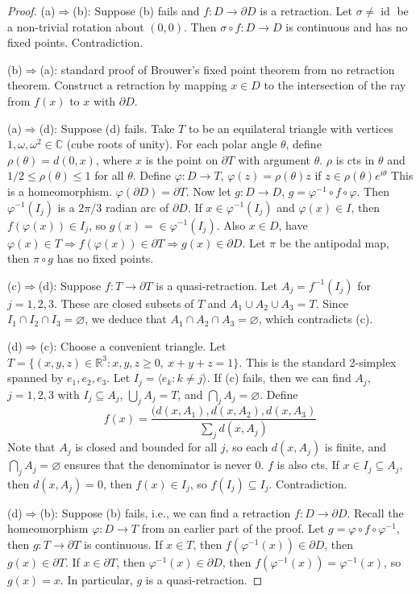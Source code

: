\documentclass{article}
\theoremstyle{definition}
\theoremstyle{remark}
\theoremstyle{plain}
\newcommand{\RR}{\mathbb{R}}
\newcommand{\CC}{\mathbb{C}}
\newcommand{\id}{\operatorname{id}}
\begin{document}
\begin{proof}
    (a)$\Rightarrow$(b): Suppose (b) fails and $f:D\to\partial D$ is a retraction. Let $\sigma\neq\id$ be a non-trivial rotation about $(0,0)$. Then $\sigma\circ f:D\to D$ is continuous and has no fixed points. Contradiction.

    (b)$\Rightarrow$(a): standard proof of Brouwer's fixed point theorem from no retraction theorem. Construct a retraction by mapping $x\in D$ to the intersection of the ray from $f(x)$ to $x$ with $\partial D$. 

    (a)$\Rightarrow$(d): Suppose (d) fails. Take $T$ to be an equilateral triangle with vertices $1,\omega,\omega^2\in\CC$ (cube roots of unity). For each polar angle $\theta$, define $\rho(\theta)=d(0,x)$, where $x$ is the point on $\partial T$ with argument $\theta$. $\rho$ is cts in $\theta$ and $1/2\le\rho(\theta)\le 1$ for all $\theta$. Define $\varphi:D\to T$, $\varphi(z)=\rho(\theta)z$ if $z\in\rho(\theta) e^{i\theta}$ This is a homeomorphism. $\varphi(\partial D)=\partial T$. Now let $g:D\to D$, $g=\varphi^{-1}\circ f\circ\varphi$. Then $\varphi^{-1}(I_j)$ is a $2\pi/3$ radian arc of $\partial D$. If $x\in\varphi^{-1}(I_j)$ and $\varphi(x)\in I$, then $f(\varphi(x))\in I_j$, so $g(x)=\in\varphi^{-1}(I_j)$. Also $x\in D$, have $\varphi(x)\in T\Rightarrow f(\varphi(x))\in\partial T\Rightarrow g(x)\in\partial D$. Let $\pi$ be the antipodal map, then $\pi\circ g$ has no fixed points.

    (c)$\Rightarrow$(d): Suppose $f:T\to\partial T$ is a quasi-retraction. Let $A_j=f^{-1}(I_j)$ for $j=1,2,3$. These are closed subsets of $T$ and $A_1\cup A_2\cup A_3=T$. Since $I_1\cap I_2\cap I_3=\varnothing$, we deduce that $A_1\cap A_2\cap A_3=\varnothing$, which contradicts (c).

    (d)$\Rightarrow$(c): Choose a convenient triangle. Let $T=\{(x,y,z)\in\RR^3: x,y,z\ge 0,\ x+y+z=1\}$. This is the standard 2-simplex spanned by $e_1,e_2,e_3$. Let $I_j=\langle e_k:k\neq j\rangle$. If (c) fails, then we can find $A_j$, $j=1,2,3$ with $I_j\subseteq A_j$, $\bigcup_j A_j=T$, and $\bigcap_jA_j=\varnothing$. Define
    \[f(x)=\dfrac{(d(x,A_1),d(x,A_2),d(x,A_3)}{\sum_jd(x,A_j)}\]
    Note that $A_j$ is closed and bounded for all $j$, so each $d(x,A_j)$ is finite, and $\bigcap_jA_j=\varnothing$ ensures that the denominator is never $0$. $f$ is also cts. If $x\in I_j\subseteq A_j$, then $d(x,A_j)=0$, then $f(x)\in I_j$, so $f(I_j)\subseteq I_j$. Contradiction.

    (d)$\Rightarrow$(b): Suppose (b) fails, i.e., we can find a retraction $f:D\to\partial D$. Recall the homeomorphism $\varphi:D\to T$ from an earlier part of the proof. Let $g=\varphi\circ f\circ\varphi^{-1}$, then $g:T\to \partial T$ is continuous. If $x\in T$, then $f(\varphi^{-1}(x))\in\partial D$, then $g(x)\in\partial T$. If $x\in\partial T$, then $\varphi^{-1}(x)\in\partial D$, then $f(\varphi^{-1}(x))=\varphi^{-1}(x)$, so $g(x)=x$. In particular, $g$ is a quasi-retraction.
\end{proof}
\end{document}
